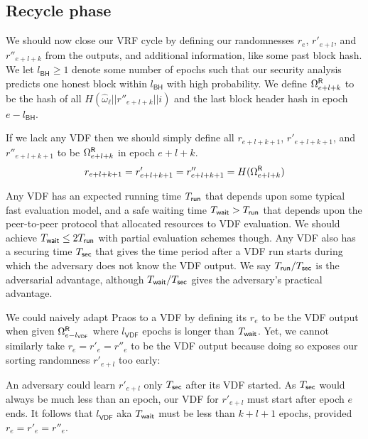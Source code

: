 \subsection{Recycle phase}\label{subsec:recycle_phase}
\newcommand\id{\mathsf{id}}
\newcommand{\epochsdelayforblockhash}{l_{\mathsf{BH}}}
\newcommand{\epochsdelayforVDF}{l_{\mathsf{VDF}}}

We should now close our VRF cycle by defining our randomnesses $r_e$, $r'_{e+l}$, and $r''_{e+l+k}$ from the \VRFr outputs, and additional information, like some past block hash.  We let $\epochsdelayforblockhash \ge 1$ denote some number of epochs such that our security analysis predicts one honest block within $\epochsdelayforblockhash$ with high probability.  We define $\Omega^{\mathsf{R}}_{e+l+k}$ to be the hash of all $H(\hat{\omega}_{\ell} || r''_{e+l+k} || i)$ and the last block header hash in epoch $e - \epochsdelayforblockhash$.

If we lack any VDF then we should simply define all $r_{e+l+k+1}$, $r'_{e+l+k+1}$, and $r''_{e+l+k+1}$ to be $\Omega^{\mathsf{R}}_{e+l+k}$ in epoch $e+l+k$.
$$
r_{e+l+k+1} = r'_{e+l+k+1} = r''_{e+l+k+1} = H(\Omega^{\mathsf{R}}_{e+l+k})
$$

Any VDF has an expected running time $T_{\mathsf{run}}$ that depends upon some typical fast evaluation model, and a safe waiting time $T_{\mathsf{wait}} > T_{\mathsf{run}}$ that depends upon the peer-to-peer protocol that allocated resources to VDF evaluation.  We should achieve $T_{\mathsf{wait}} \le 2 T_{\mathsf{run}}$ with partial evaluation schemes though.  Any VDF also has a securing time $T_{\mathsf{sec}}$ that gives the time period after a VDF run starts during which the adversary does not know the VDF output.  We say $T_{\mathsf{run}}/T_{\mathsf{sec}}$ is the adversarial advantage, although $T_{\mathsf{wait}}/T_{\mathsf{sec}}$ gives the adversary's practical advantage.  

We could naively adapt Praos to a VDF by defining its $r_e$ to be the VDF output when given $\Omega^{\labelVRFr}_{e-\epochsdelayforVDF}$ where $\epochsdelayforVDF$ epochs is longer than $T_{\mathsf{wait}}$.  Yet, we cannot similarly take $r_e = r'_e = r''_e$ to be the VDF output because doing so exposes our sorting randomness $r'_{e+l}$ too early: 

An adversary could learn $r'_{e+l}$ only $T_{\mathsf{sec}}$ after its VDF started.  As $T_{\mathsf{sec}}$ would always be much less than an epoch, our VDF for $r'_{e+l}$ must start after epoch $e$ ends.  It follows that $\epochsdelayforVDF$ aka $T_{\mathsf{wait}}$ must be less than $k+l+1$ epochs, provided $r_e = r'_e = r''_e$.  


